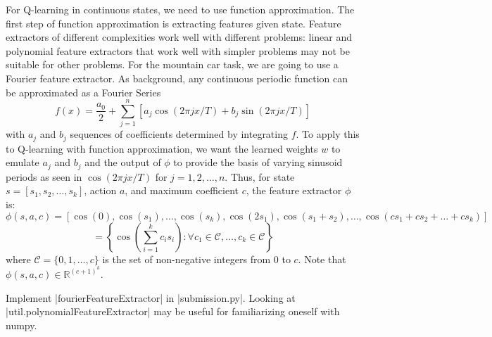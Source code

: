 \item {}

For Q-learning in continuous states, we need to use function approximation. The first step of function approximation is extracting 
features given state. Feature extractors of different complexities work well with different problems: linear and polynomial feature 
extractors that work well with simpler problems may not be suitable for other problems. For the mountain car task, we are going to use 
a Fourier feature extractor. As background, any continuous periodic function can be approximated as a Fourier Series
$$f(x) = \frac{a_0}{2} + \sum_{j=1}^n\left[a_j\cos(2\pi j x/T) + b_j\sin(2\pi j x/ T)\right]$$
with $a_j$ and $b_j$ sequences of coefficients determined by integrating $f$. To apply this to Q-learning with function approximation,
we want the learned weights $w$ to emulate $a_j$ and $b_j$ and the output of $\phi$ to provide the basis of varying sinusoid periods
as seen in $\cos(2\pi j x/T)$ for $j = 1, 2, \ldots, n$.
Thus, for state $s = [s_1, s_2, \ldots, s_k]$, action $a$, and maximum coefficient $c$, the feature extractor $\phi$ is:
$$\phi(s, a, c) = [\cos(0), \cos(s_1), \ldots, \cos(s_k), \cos(2s_1), \cos(s_1+s_2), \ldots, \cos(cs_1 + cs_2 + \ldots + cs_k)]$$
$$= \left\{\cos\left(\sum_{i=1}^k c_i s_i\right): \forall c_1\in\mathscr{C}, \ldots, c_k\in\mathscr{C}\right\}$$
where $\mathscr{C} = \{0, 1, \ldots, c\}$ is the set of non-negative integers from 0 to $c$. Note that $\phi(s, a, c) \in \mathbb{R}^{(c+1)^k}$.

Implement |fourierFeatureExtractor| in |submission.py|. Looking at |util.polynomialFeatureExtractor| may be useful
for familiarizing oneself with numpy.


